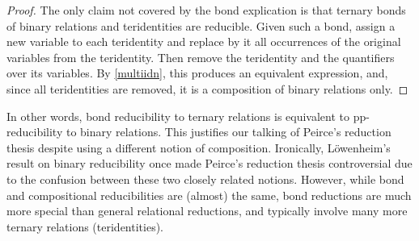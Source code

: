 \documentclass[11pt]{article}
\theoremstyle{plain}
\theoremstyle{definition}
\begin{document}
\begin{proof} The only claim not covered by the bond explication is that ternary  bonds of binary relations and teridentities are reducible. Given such a bond, assign a new variable to each teridentity and replace by it all occurrences of the original variables from the teridentity. Then remove the teridentity and the quantifiers over its variables. By \eqref{multiidn}, this produces an equivalent expression, and, since all teridentities are removed, it is a composition of binary relations only.
\end{proof}
\noindent In other words, bond reducibility to ternary relations is equivalent to pp-reducibility to binary relations. This justifies our talking of Peirce's reduction thesis despite using a different notion of composition. Ironically, L\"owenheim's result on binary reducibility \cite{Low} once made Peirce's reduction thesis controversial due to the confusion between these two closely related notions. However, while bond and compositional reducibilities are (almost) the same, bond reductions are much more special than general relational reductions, and typically involve many more ternary relations (teridentities). 
\end{document}
